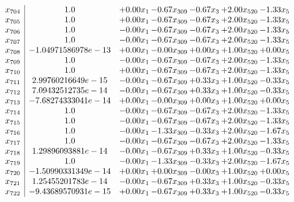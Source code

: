 \documentclass[8pt]{article}
\begin{document}
\[\begin{array}{c| c c@{\hskip 2pt} c@{\hskip 2pt} c@{\hskip 2pt} c@{\hskip 2pt} c@{\hskip 2pt} }
 x_{704}   &  1.0 & +  0.00 x_{1} & -0.67 x_{309} & -0.67 x_{3} & +  2.00 x_{520} & -1.33 x_{5}\\
 x_{705}   &  1.0 & +  0.00 x_{1} & -0.67 x_{309} & -0.67 x_{3} & +  2.00 x_{520} & -1.33 x_{5}\\
 x_{706}   &  1.0 & -0.00 x_{1} & -0.67 x_{309} & -0.67 x_{3} & +  2.00 x_{520} & -1.33 x_{5}\\
 x_{707}   &  1.0 & -0.00 x_{1} & -0.67 x_{309} & -0.67 x_{3} & +  2.00 x_{520} & -1.33 x_{5}\\
 x_{708}   &  -1.04971586978e-13 & +  0.00 x_{1} & -0.00 x_{309} & +  0.00 x_{3} & +  1.00 x_{520} & +  0.00 x_{5}\\
 x_{709}   &  1.0 & -0.00 x_{1} & -0.67 x_{309} & -0.67 x_{3} & +  2.00 x_{520} & -1.33 x_{5}\\
 x_{710}   &  1.0 & +  0.00 x_{1} & -0.67 x_{309} & -0.67 x_{3} & +  2.00 x_{520} & -1.33 x_{5}\\
 x_{711}   &  2.99760216649e-15 & -0.00 x_{1} & -0.67 x_{309} & +  0.33 x_{3} & +  1.00 x_{520} & -0.33 x_{5}\\
 x_{712}   &  7.09432512735e-14 & -0.00 x_{1} & -0.67 x_{309} & +  0.33 x_{3} & +  1.00 x_{520} & -0.33 x_{5}\\
 x_{713}   &  -7.68274333041e-14 & +  0.00 x_{1} & -0.00 x_{309} & +  0.00 x_{3} & +  1.00 x_{520} & +  0.00 x_{5}\\
 x_{714}   &  1.0 & -0.00 x_{1} & -0.67 x_{309} & -0.67 x_{3} & +  2.00 x_{520} & -1.33 x_{5}\\
 x_{715}   &  1.0 & -0.00 x_{1} & -0.67 x_{309} & -0.67 x_{3} & +  2.00 x_{520} & -1.33 x_{5}\\
 x_{716}   &  1.0 & -0.00 x_{1} & -1.33 x_{309} & -0.33 x_{3} & +  2.00 x_{520} & -1.67 x_{5}\\
 x_{717}   &  1.0 & -0.00 x_{1} & -0.67 x_{309} & -0.67 x_{3} & +  2.00 x_{520} & -1.33 x_{5}\\
 x_{718}   &  1.29896093881e-14 & -0.00 x_{1} & -0.67 x_{309} & +  0.33 x_{3} & +  1.00 x_{520} & -0.33 x_{5}\\
 x_{719}   &  1.0 & -0.00 x_{1} & -1.33 x_{309} & -0.33 x_{3} & +  2.00 x_{520} & -1.67 x_{5}\\
 x_{720}   &  -1.50990331349e-14 & +  0.00 x_{1} & +  0.00 x_{309} & -0.00 x_{3} & +  1.00 x_{520} & +  0.00 x_{5}\\
 x_{721}   &  1.25455201783e-14 & -0.00 x_{1} & -0.67 x_{309} & +  0.33 x_{3} & +  1.00 x_{520} & -0.33 x_{5}\\
 x_{722}   &  -9.43689570931e-15 & +  0.00 x_{1} & -0.67 x_{309} & +  0.33 x_{3} & +  1.00 x_{520} & -0.33 x_{5}\\

\end{array}\]
\end{document}
